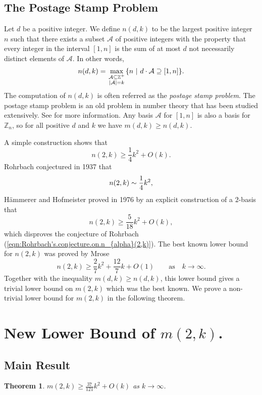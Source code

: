 \documentclass[11pt]{article}
\newtheorem{theorem}{Theorem}[section]
\theoremstyle{definition}
\def\Z{\mbox{$\mathbb Z$}}
\begin{document}
\subsection{The Postage Stamp Problem}
 Let $d$ be a positive integer. We define $n(d, k)$ to be the largest positive integer $n$ such that there exists a subset $\mathcal{A}$ of positive integers with the property that every integer in the interval $[1, n]$ is the sum of at most $d$ not necessarily distinct elements of $\mathcal{A}$. In other words, 
\[
n(d, k) = \max_{\scriptstyle \mathcal{A}\subseteq\mathbb Z^{+}\atop\scriptstyle |\mathcal{A}|=k}\{n\  |\ d\cdot \mathcal{A}\supseteq[1, n]\}.
\]
The computation of  $n(d, k)$ is often referred as the \emph{postage stamp problem}. The postage stamp problem is an old problem in number theory that has been studied extensively. See \cite{Hsu-Jia:CombinatorialNetworks,Selmer:1986a,Selmer:1986b} for more information. Any basis $\mathcal{A}$ for $[1, n]$ is also a basis for $\Z_n$, so for all positive $d$ and $k$ we have $m(d, k) \geq n(d, k)$.


A simple construction shows that 
\[
n(2,k)\ge \frac14k^{2}+O(k).
\]
 Rohrbach \cite{Rohrbach:1937a} conjectured in 1937 that
\begin{equation}\label{eqn:Rohrbach's.conjecture.on.n_{alpha}(2,k)}
n(2,k)\sim\frac14{k^2},
\end{equation}
H\"ammerer and Hofmeister \cite{Hammerer-Hofmeister:1976} proved in
1976 by an explicit construction
of a $2$-basis that
\[
n(2,k)\ge \frac {5}{18}{k^2}+O(k),
\]
which disproves the conjecture of Rohrbach
(\ref{eqn:Rohrbach's.conjecture.on.n_{alpha}(2,k)}).
The  best known lower bound for $n(2,k)$ was proved by Mrose \cite{Mrose1979}
\[
n(2, k) \geq \frac{2}{7}k^2 + \frac{12}{7}k + O(1)\qquad  \text{as}\quad  k \to \infty.
\]
 Together with the inequality $m(d, k) \geq n(d, k)$, this lower bound gives a trivial lower bound on $m(2, k)$ which was the best known. We prove a non-trivial lower bound for $m(2,k)$ in the following theorem.

 
\section{New Lower Bound of $m(2, k)$.}
\subsection{Main Result}

 
\begin{theorem}
$\displaystyle m(2,k) \geq \frac{37}{121}k^2 + O(k)$  as $ k \to \infty$.
\end{theorem}
\end{document}
